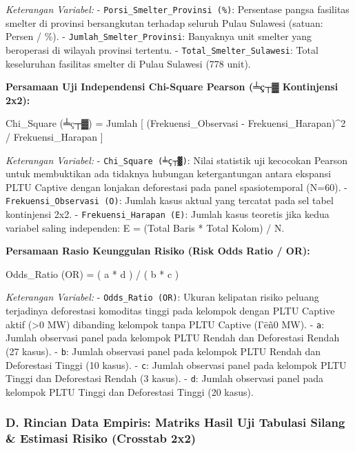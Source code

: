 \documentclass[
]{article}
\newenvironment{Shaded}{}{}
\newcommand{\NormalTok}[1]{#1}
\begin{document}
\emph{Keterangan Variabel:} - \texttt{Porsi\_Smelter\_Provinsi\ (\%)}:
Persentase pangsa fasilitas smelter di provinsi bersangkutan terhadap
seluruh Pulau Sulawesi (satuan: Persen / \%). -
\texttt{Jumlah\_Smelter\_Provinsi}: Banyaknya unit smelter yang
beroperasi di wilayah provinsi tertentu. -
\texttt{Total\_Smelter\_Sulawesi}: Total keseluruhan fasilitas smelter
di Pulau Sulawesi (778 unit).

\textbf{Persamaan Uji Independensi Chi-Square Pearson (╧ç┬▓ Kontinjensi
2x2):}

\begin{Shaded}
\begin{Highlighting}[]
\NormalTok{Chi\_Square (╧ç┬▓) = Jumlah [ (Frekuensi\_Observasi {-} Frekuensi\_Harapan)\^{}2 / Frekuensi\_Harapan ]}
\end{Highlighting}
\end{Shaded}

\emph{Keterangan Variabel:} - \texttt{Chi\_Square\ (╧ç┬▓)}: Nilai
statistik uji kecocokan Pearson untuk membuktikan ada tidaknya hubungan
ketergantungan antara ekspansi PLTU Captive dengan lonjakan deforestasi
pada panel spasiotemporal (N=60). - \texttt{Frekuensi\_Observasi\ (O)}:
Jumlah kasus aktual yang tercatat pada sel tabel kontinjensi 2x2. -
\texttt{Frekuensi\_Harapan\ (E)}: Jumlah kasus teoretis jika kedua
variabel saling independen: E = (Total Baris * Total Kolom) / N.

\textbf{Persamaan Rasio Keunggulan Risiko (Risk Odds Ratio / OR):}

\begin{Shaded}
\begin{Highlighting}[]
\NormalTok{Odds\_Ratio (OR) = ( a * d ) / ( b * c )}
\end{Highlighting}
\end{Shaded}

\emph{Keterangan Variabel:} - \texttt{Odds\_Ratio\ (OR)}: Ukuran
kelipatan risiko peluang terjadinya deforestasi komoditas tinggi pada
kelompok dengan PLTU Captive aktif (\textgreater0 MW) dibanding kelompok
tanpa PLTU Captive (Γëñ0 MW). - \texttt{a}: Jumlah observasi panel pada
kelompok PLTU Rendah dan Deforestasi Rendah (27 kasus). - \texttt{b}:
Jumlah observasi panel pada kelompok PLTU Rendah dan Deforestasi Tinggi
(10 kasus). - \texttt{c}: Jumlah observasi panel pada kelompok PLTU
Tinggi dan Deforestasi Rendah (3 kasus). - \texttt{d}: Jumlah observasi
panel pada kelompok PLTU Tinggi dan Deforestasi Tinggi (20 kasus).

\subsubsection{D. Rincian Data Empiris: Matriks Hasil Uji Tabulasi
Silang \& Estimasi Risiko (Crosstab
2x2)}\label{d.-rincian-data-empiris-matriks-hasil-uji-tabulasi-silang-estimasi-risiko-crosstab-2x2}
\end{document}
